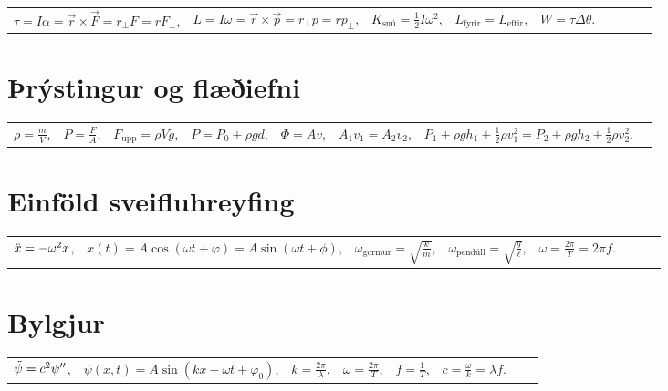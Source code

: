 \begin{table}[H]
\begin{tabular}{lllllllll}
$\tau = I\alpha = \Vec{r} \times \Vec{F} = r_\perp F = r F_\perp$, & $L = I\omega = \Vec{r} \times \Vec{p} = r_\perp p = r p_\perp$, & $K_{\text{snú}} = \frac{1}{2}I\omega^2$, & $L_{\text{fyrir}} = L_{\text{eftir}}$, & $W = \tau \Delta \theta$.
\end{tabular}
\end{table}

\section*{Þrýstingur og flæðiefni}

\begin{table}[H]
\begin{tabular}{llllllll}
$\rho = \frac{m}{V}$, & $P = \frac{F}{A}$, & $F_{\text{upp}} = \rho Vg$, & $P = P_0 + \rho gd$, & $\Phi = Av$, & $A_1 v_1 = A_2 v_2$, & $P_1 + \rho gh_1 + \frac{1}{2}\rho v_1^2 = P_2 + \rho gh_2 + \frac{1}{2}\rho v_2^2$.
\end{tabular}
\end{table}

\section*{Einföld sveifluhreyfing}

\begin{table}[H]
\begin{tabular}{llllllll}
$\Ddot{x} = - \omega^2 x$, & $x(t) = A\cos(\omega t + \varphi) = A\sin(\omega t + \phi)$, & $\omega_{\text{gormur}} = \sqrt{\frac{k}{m}}$, & $\omega_{\text{pendúll}} = \sqrt{\frac{g}{\ell}}$, & $\omega = \frac{2\pi}{T} = 2\pi f$.
\end{tabular}
\end{table}

\section*{Bylgjur}

\begin{table}[H]
\begin{tabular}{llllllll}
$\Ddot{\psi} = c^2 \psi''$, & $\psi(x,t) = A\sin(kx - \omega t + \varphi_0)$, & $k = \frac{2\pi}{\lambda}$, & $\omega = \frac{2\pi}{T}$, & $f = \frac{1}{T}$, & $c = \frac{\omega}{k} = \lambda f$.
\end{tabular}
\end{table}

